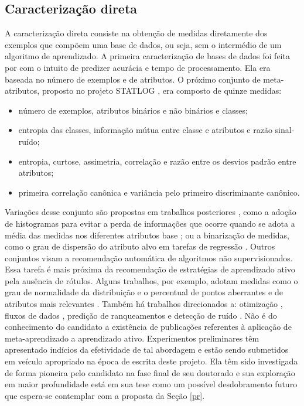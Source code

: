 \subsection{Caracterização direta}\label{direta}
A caracterização direta consiste na obtenção de medidas diretamente dos exemplos
que compõem uma base de dados, ou seja, sem o intermédio de um algoritmo
de aprendizado.
A primeira caracterização de bases de dados foi feita por \cite{conf/ijcai/RendellST87}
com o intuito de predizer acurácia e tempo de processamento.
Ela era baseada no número de exemplos e de atributos.
O próximo conjunto de meta-atributos, proposto no projeto STATLOG
\citep{brazdil1994analysis}, era composto de quinze medidas:
\begin{itemize}
 \item número de exemplos, atributos binários e não binários e classes;
 \item entropia das classes, informação mútua entre classe e atributos e razão sinal-ruído;
 \item entropia, curtose, assimetria, correlação e razão entre os desvios padrão entre atributos;
 \item primeira correlação canônica e variância pelo primeiro discriminante canônico.
\end{itemize}
Variações desse conjunto são propostas em trabalhos posteriores
\citep{books/daglib/0022052},
como a adoção de histogramas para evitar a perda de informações que ocorre quando
se adota a média das medidas nos diferentes atributos base \citep{kalousis2002algorithm};
ou a binarização de medidas, como o grau de dispersão do atributo alvo em
tarefas de regressão \citep{journals/ijon/GomesPSRC12}.
Outros conjuntos visam a recomendação automática de algoritmos não supervisionados.
Essa tarefa é mais próxima da recomendação de estratégias de aprendizado ativo
pela ausência de rótulos.
Alguns trabalhos, por exemplo, adotam medidas como o grau de normalidade da distribuição e
o percentual de pontos aberrantes e de atributos mais relevantes
\citep{conf/ijcnn/SoutoPSACLS08,Ferrari2015181}.
Também há trabalhos direcionados a: otimização \citep{journals/ijhis/KandaCHS11},
fluxos de dados \citep{journals/ijon/RossiCSS14}, predição de ranqueamentos
\citep{conf/iberamia/SouzaCS10} e detecção de ruído \citep{Garcia2015}.
Não é do conhecimento do candidato a existência de publicações referentes à
aplicação de meta-aprendizado a aprendizado ativo.
Experimentos preliminares têm apresentado indícios da efetividade de tal abordagem
e estão sendo submetidos em veículo apropriado na época de escrita deste projeto.
Ela têm sido investigada de forma pioneira pelo candidato na fase final de seu doutorado
e sua exploração em maior profundidade está em sua tese como um possível desdobramento futuro
que espera-se contemplar com a proposta da Seção \ref{pr}.


